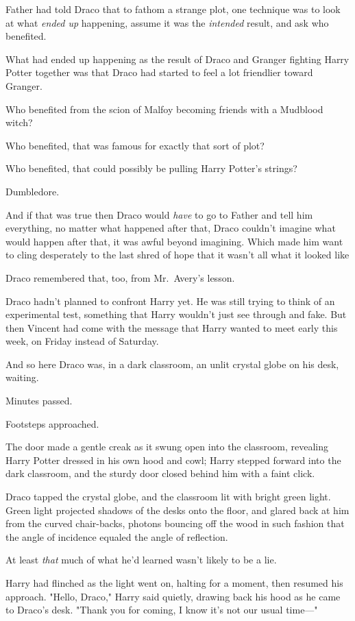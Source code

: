 Father had told Draco that to fathom a strange plot, one technique was to look
at what \emph{ended up} happening, assume it was the \emph{intended} result,
and ask who benefited.

What had ended up happening as the result of Draco and Granger fighting Harry
Potter together{\el} was that Draco had started to feel a lot friendlier
toward Granger.

Who benefited from the scion of Malfoy becoming friends with a Mudblood witch?

Who benefited, that was famous for exactly that sort of plot?

Who benefited, that could possibly be pulling Harry Potter's strings?

Dumbledore.

And if that was true then Draco would \emph{have} to go to Father and tell him
everything, no matter what happened after that, Draco couldn't imagine what
would happen after that, it was awful beyond imagining. Which made him want to
cling desperately to the last shred of hope that it wasn't all what it looked
like{\el}

{\el} Draco remembered that, too, from Mr.~Avery's lesson.

Draco hadn't planned to confront Harry yet. He was still trying to think of an
experimental test, something that Harry wouldn't just see through and fake. But
then Vincent had come with the message that Harry wanted to meet early this
week, on Friday instead of Saturday.

And so here Draco was, in a dark classroom, an unlit crystal globe on his desk,
waiting.

Minutes passed.

Footsteps approached.

The door made a gentle creak as it swung open into the classroom, revealing
Harry Potter dressed in his own hood and cowl; Harry stepped forward into the
dark classroom, and the sturdy door closed behind him with a faint click.

Draco tapped the crystal globe, and the classroom lit with bright green light.
Green light projected shadows of the desks onto the floor, and glared back at
him from the curved chair-backs, photons bouncing off the wood in such fashion
that the angle of incidence equaled the angle of reflection.

At least \emph{that} much of what he'd learned wasn't likely to be a lie.

Harry had flinched as the light went on, halting for a moment, then resumed his
approach. "Hello, Draco," Harry said quietly, drawing back his hood as he came
to Draco's desk. "Thank you for coming, I know it's not our usual time\mbox{---}"

